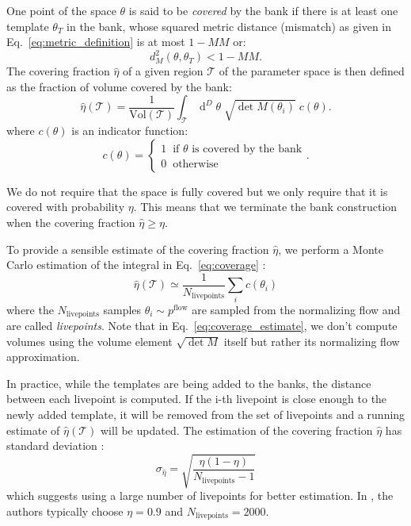 \documentclass[twocolumn,showpacs,preprintnumbers,nofootinbib,prd,
superscriptaddress,10pt]{revtex4-2}
\newcommand{\dvol}[2]{\ensuremath{\operatorname{d}^{#2}\!{#1}}}
\begin{document}
One point of the space $\theta$ is said to be {\it covered} by the bank if there is at least one template $\theta_T$ in the bank, whose squared metric distance (mismatch) as given in Eq.~\eqref{eq:metric_definition} is at most $1 - MM$ or:
\begin{equation}
	d^2_M(\theta, \theta_T)<1 - MM.
\end{equation}
%
The covering fraction $\hat{\eta}$ of a given region $\mathcal{T}$ of the parameter space is then defined as the fraction of volume covered by the bank:
\begin{equation}\label{eq:coverage}
	\hat{\eta}(\mathcal{T}) = \frac{1}{\text{Vol}(\mathcal{T})} \int_\mathcal{T} \dvol{\theta}{D} \; \sqrt{\det M(\theta_i)} \; c(\theta).
\end{equation}
where $c(\theta)$ is an indicator function:
\begin{equation}
	c(\theta) = \left\{
                \begin{array}{ll}
                  1 \;\; \text{if $\theta$ is covered by the bank}\\
                  0 \;\; \text{otherwise}
                \end{array}.
              \right.
\end{equation}

We do not require that the space is fully covered but we only require that it is covered with probability $\eta$. This means that we terminate the bank construction when the covering fraction $\hat{\eta} \geq \eta$.

To provide a sensible estimate of the covering fraction $\hat{\eta}$, we perform a Monte Carlo estimation of the integral in Eq.~\eqref{eq:coverage} \cite{Coogan:2022qxs}:
\begin{equation}\label{eq:coverage_estimate}
	\hat{\eta}(\mathcal{T}) \simeq \frac{1}{N_\text{livepoints}} \sum_i c(\theta_i)
\end{equation}
%
where the $N_\text{livepoints}$ samples $\theta_i \sim p^\text{flow}$ are sampled from the normalizing flow and are called {\it livepoints}.
Note that in Eq.~\eqref{eq:coverage_estimate}, we don't compute volumes using the volume element $\sqrt{\det M}$ itself but rather its normalizing flow approximation.

In practice, while the templates are being added to the banks, the distance between each livepoint is computed. If the i-th livepoint is close enough to the newly added template, it will be removed from the set of livepoints and a running estimate of $\hat{\eta}(\mathcal{T})$ will be updated.
The estimation of the covering fraction $\hat{\eta}$ has standard deviation \cite[App. A]{Coogan:2022qxs}:
\begin{equation}\label{eq:variance_coverage}
	\sigma_{\hat{\eta}} = \sqrt{\frac{\eta(1-\eta)}{N_\text{livepoints}-1}}
\end{equation}
which suggests using a large number of livepoints for better estimation.
In \cite{Coogan:2022qxs}, the authors typically choose $\eta = 0.9$ and $N_\text{livepoints} = 2000$.
\end{document}
